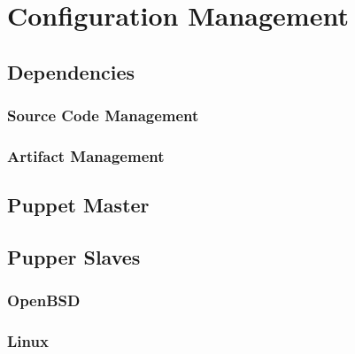 \chapter{Configuration Management}

\section{Dependencies}

\subsection{Source Code Management}

\subsection{Artifact Management}

\section{Puppet Master}

\section{Pupper Slaves}

\subsection{OpenBSD}

\subsection{Linux}

